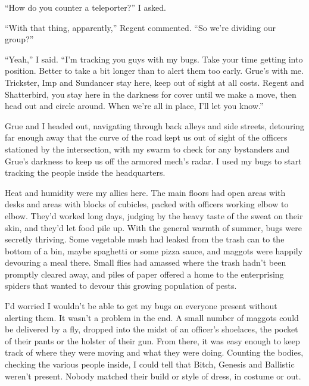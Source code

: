 ``How do you counter a teleporter?''  I asked.



``With that thing, apparently,'' Regent commented.  ``So we're dividing our group?''



``Yeah,'' I said.  ``I'm tracking you guys with my bugs.  Take your time getting into position.  Better to take a bit longer than to alert them too early.  Grue's with me.  Trickster, Imp and Sundancer stay here, keep out of sight at all costs.  Regent and Shatterbird, you stay here in the darkness for cover until we make a move, then head out and circle around.  When we're all in place, I'll let you know.''



Grue and I headed out, navigating through back alleys and side streets, detouring far enough away that the curve of the road kept us out of sight of the officers stationed by the intersection, with my swarm to check for any bystanders and Grue's darkness to keep us off the armored mech's radar.  I used my bugs to start tracking the people inside the headquarters.



Heat and humidity were my allies here.  The main floors had open areas with desks and areas with blocks of cubicles, packed with officers working elbow to elbow.  They'd worked long days, judging by the heavy taste of the sweat on their skin, and they'd let food pile up. With the general warmth of summer, bugs were secretly thriving.  Some vegetable mush had leaked from the trash can to the bottom of a bin, maybe spaghetti or some pizza sauce, and maggots were happily devouring a meal there.  Small flies had amassed where the trash hadn't been promptly cleared away, and piles of paper offered a home to the enterprising spiders that wanted to devour this growing population of pests.



I'd worried I wouldn't be able to get my bugs on everyone present without alerting them.  It wasn't a problem in the end.  A small number of maggots could be delivered by a fly, dropped into the midst of an officer's shoelaces, the pocket of their pants or the holster of their gun.  From there, it was easy enough to keep track of where they were moving and what they were doing.  Counting the bodies, checking the various people inside, I could tell that Bitch, Genesis and Ballistic weren't present.  Nobody matched their build or style of dress, in costume or out.



